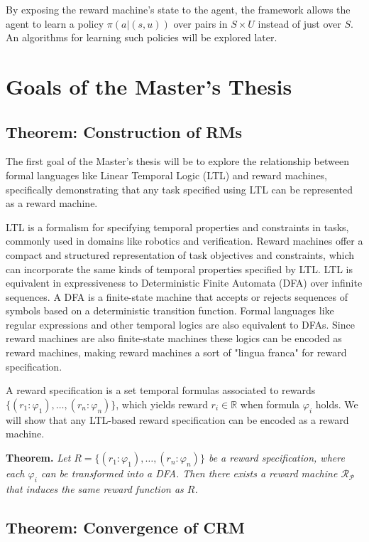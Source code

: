 \documentclass[12pt, a4paper]{article}
\renewcommand{\phi}{\varphi}
\begin{document}
By exposing the reward machine's state to the agent, the framework allows the agent to learn a policy $\pi(a | (s,u))$ over pairs in $S \times U$ instead of just over $S$. An algorithms for learning such policies will be explored later.


\section*{Goals of the Master's Thesis}

\subsection*{Theorem: Construction of RMs}

The first goal of the Master's thesis will be to explore the relationship between formal languages like Linear Temporal Logic (LTL) and reward machines, specifically demonstrating that any task specified using LTL can be represented as a reward machine.

LTL is a formalism for specifying temporal properties and constraints in tasks, commonly used in domains like robotics and verification. Reward machines offer a compact and structured representation of task objectives and constraints, which can incorporate the same kinds of temporal properties specified by LTL. LTL is equivalent in expressiveness to Deterministic Finite Automata (DFA) over infinite sequences. A DFA is a finite-state machine that accepts or rejects sequences of symbols based on a deterministic transition function. Formal languages like regular expressions and other temporal logics are also equivalent to DFAs. Since reward machines are also finite-state machines these logics can be encoded as reward machines, making reward machines a sort of "lingua franca" for reward specification.

A reward specification is a set temporal formulas associated to rewards $\{(r_1 : \phi_1), \dots, (r_n : \phi_n)\}$, which yields reward $r_i \in \mathbb{R}$ when formula $\phi_i$ holds. We will show that any LTL-based reward specification can be encoded as a reward machine.

\textbf{Theorem.}
\emph{Let $R = \{(r_1 : \phi_1), \dots, (r_n : \phi_n)\}$ be a reward specification, where each $\phi_i$ can be transformed into a DFA. Then there exists a reward machine $\mathcal{R}_\mathcal{P}$ that induces the same reward function as $R$.}
\cite{LTL2019}

\subsection*{Theorem: Convergence of CRM}
\end{document}
